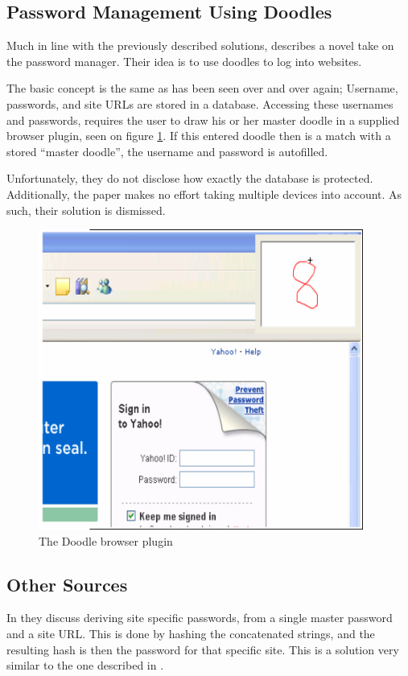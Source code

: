 		\subsection*{Password Management Using Doodles}
			Much in line with the previously described solutions, \cite{doodles} describes a novel take on the password manager. Their idea is to use doodles to log into websites.

			The basic concept is the same as has been seen over and over again; Username, passwords, and site URLs are stored in a database. Accessing these usernames and passwords, requires the user to draw his or her master doodle in a supplied browser plugin, seen on figure \ref{fig:doodle}. If this entered doodle then is a match with a stored ``master doodle'', the username and password is autofilled.

			Unfortunately, they do not disclose how exactly the database is protected. Additionally, the paper makes no effort taking multiple devices into account. As such, their solution is dismissed.

			\begin{figure}[htbp]
				\centering
				\includegraphics[width=0.95\textwidth]{figures/analysis/doodle.png}
				\caption{The Doodle browser plugin}
				\label{fig:doodle}
			\end{figure}

		\subsection*{Other Sources}
			In \cite{halderman2005} they discuss deriving site specific passwords, from a single master password and a site URL. This is done by hashing the concatenated strings, and the resulting hash is then the password for that specific site. This is a solution very similar to the one described in \cite{pwdhash}.

